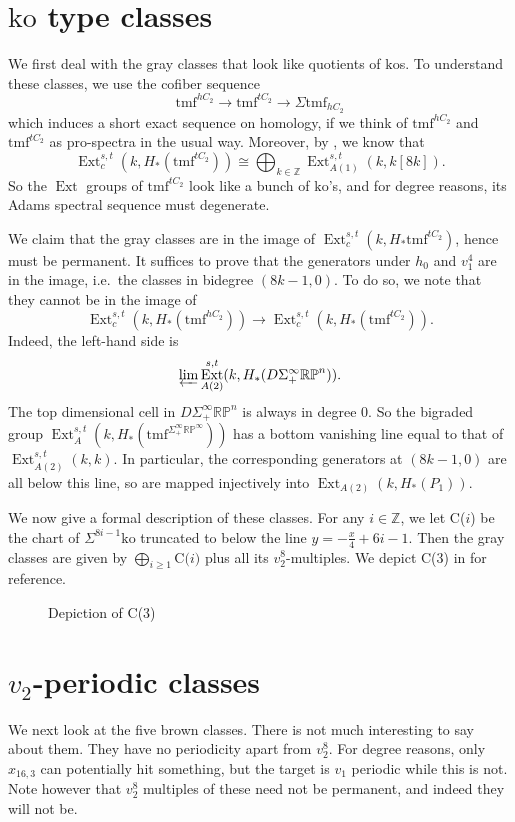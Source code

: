 \documentclass{shortart}
\DeclareMathOperator\Ext{Ext}
\newcommand\Z{{\mathbb{Z}}}
\newcommand\RP{{\mathbb{RP}}}
\newcommand\tmf{{\mathrm{tmf}}}
\newcommand\ko{{\mathrm{ko}}}
\begin{document}
\section{\texorpdfstring{$\ko$}{ko} type classes}
We first deal with the gray classes that look like quotients of $\ko$s. To understand these classes, we use the cofiber sequence
\[
  \tmf^{hC_2} \to \tmf^{t C_2} \to \Sigma \tmf_{hC_2}
\]
which induces a short exact sequence on homology, if we think of $\tmf^{hC_2}$ and $\tmf^{t C_2}$ as pro-spectra in the usual way. Moreover, by \cite[Lemma 1.3]{lin-ext}, we know that
\[
  \Ext^{s, t}_c(k, H_*(\tmf^{t C_2})) \cong \bigoplus_{k \in \Z} \Ext_{A(1)}^{s, t}(k, k[8k]).
\]
So the $\Ext$ groups of $\tmf^{tC_2}$ look like a bunch of $\ko$'s, and for degree reasons, its Adams spectral sequence must degenerate.

We claim that the gray classes are in the image of $\Ext^{s, t}_c(k, H_*\tmf^{tC_2})$, hence must be permanent. It suffices to prove that the generators under $h_0$ and $v_1^4$ are in the image, i.e.\ the classes in bidegree $(8k - 1, 0)$. To do so, we note that they cannot be in the image of
\[
  \Ext^{s, t}_c(k, H_*(\tmf^{h C_2})) \to \Ext^{s, t}_c(k, H_*(\tmf^{t C_2})).
\]
Indeed, the left-hand side is
\[
  \varprojlim \Ext^{s, t}_{A(2)} (k, H_*(D \Sigma^\infty_+\RP^n)).
\]
The top dimensional cell in $D \Sigma^\infty_+ \RP^n$ is always in degree $0$. So the bigraded group $\Ext^{s, t}_A(k, H_*(\tmf^{\Sigma^\infty_+ \RP^\infty}))$ has a bottom vanishing line equal to that of $\Ext^{s, t}_{A(2)}(k, k)$. In particular, the corresponding generators at $(8k - 1, 0)$ are all below this line, so are mapped injectively into $\Ext_{A(2)}(k, H_*(P_1))$.

We now give a formal description of these classes. For any $i \in \Z$, we let C($i$) be the chart of $\Sigma^{8i - 1}\ko$ truncated to below the line $y = -\frac{x}{4} + 6i - 1$. Then the gray classes are given by $\bigoplus_{i \geq 1} \text{C($i$)}$ plus all its $v_2^8$-multiples. We depict C($3$) in  for reference.
\begin{figure}[h]
  \centering
  \begin{sseqpage}[scale=0.5, classes = fill, grid = go, grid step = 4]
  \end{sseqpage}
  \caption{Depiction of C($3$)}\label{figure:c3}
\end{figure}


\section{\texorpdfstring{$v_2$}{v2}-periodic classes}
We next look at the five brown classes. There is not much interesting to say about them. They have no periodicity apart from $v_2^8$. For degree reasons, only $x_{16, 3}$ can potentially hit something, but the target is $v_1$ periodic while this is not. Note however that $v_2^8$ multiples of these need not be permanent, and indeed they will not be.
\end{document}
